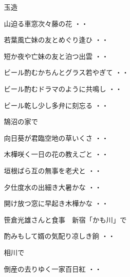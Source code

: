 \vspace{0.4cm}
玉造
\begin{shiika}山迫る車窓次々藤の花
\hfill{・・}\end{shiika}
\begin{shiika}若葉風亡妹の友とめぐり逢ひ
\hfill{・・}\end{shiika}
\begin{shiika}短か夜や亡妹の友と泊つ出雲
\hfill{・・}\end{shiika}
\begin{shiika}ビール酌むかちんとグラス若やぎて
\hfill{・・}\end{shiika}
\begin{shiika}ビール酌むドラマのように共鳴し
\hfill{・・}\end{shiika}
\begin{shiika}ビール乾し少し多弁に刻忘る
\hfill{・・}\end{shiika}
\vspace{0.4cm}
鵠沼の家で
\begin{shiika}向日葵が君臨空地の草いくさ
\hfill{・・}\end{shiika}
\begin{shiika}木樺咲く一日の花の教えごと
\hfill{・・}\end{shiika}
\begin{shiika}垣根ばら互の無事を老犬と
\hfill{・・}\end{shiika}
\begin{shiika}夕仕度水の出細き大暑かな
\hfill{・・}\end{shiika}
\begin{shiika}開け放つ窓に早起き木樺かな
\hfill{・・}\end{shiika}
\vspace{0.4cm}
笹倉光雄さんと食事　新宿「かも川」で
\begin{shiika}酌みもして婿の気配り凉しき餉
\hfill{・・}\end{shiika}
\vspace{0.4cm}
相川で
\begin{shiika}倒産の去りゆく一家百日紅
\hfill{・・}\end{shiika}

